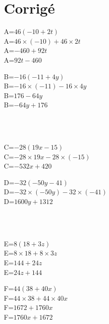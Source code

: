 \documentclass{article}%
\begin{document}
\section{Corrigé}%
\label{sec:Corrig}%
\begin{minipage}{0.5\textwidth}%
A=$46(-10+2t)$\\%
A=$46 \times (-10)+46 \times 2t$\\%
A=$-460+92t$\\%
A=$92t-460$\\%
\end{minipage}%
\begin{minipage}{0.5\textwidth}%
B=$-16(-11+4y)$\\%
B=$-16 \times (-11)-16 \times 4y$\\%
B=$176-64y$\\%
B=$-64y+176$\\%
\end{minipage}%
\\%
\\%
\begin{minipage}{0.5\textwidth}%
C=$-28(19x-15)$\\%
C=$-28 \times 19x-28 \times (-15)$\\%
C=$-532x+420$\\%
\end{minipage}%
\begin{minipage}{0.5\textwidth}%
D=$-32(-50y-41)$\\%
D=$-32 \times (-50y)-32 \times (-41)$\\%
D=$1600y+1312$\\%
\end{minipage}%
\\%
\\%
\begin{minipage}{0.5\textwidth}%
E=$8(18+3z)$\\%
E=$8 \times 18+8 \times 3z$\\%
E=$144+24z$\\%
E=$24z+144$\\%
\end{minipage}%
\begin{minipage}{0.5\textwidth}%
F=$44(38+40x)$\\%
F=$44 \times 38+44 \times 40x$\\%
F=$1672+1760x$\\%
F=$1760x+1672$\\%
\end{minipage}%
\\%
\\%
\end{document}
